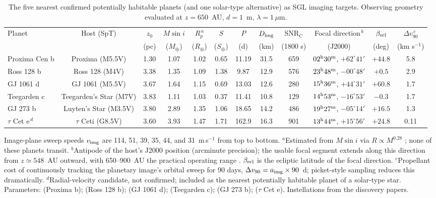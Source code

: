 ﻿\documentclass[twocolumn,10pt]{article}
\begin{document}
\begin{table}[t]
\centering
\caption{The five nearest confirmed potentially habitable planets (and
one solar-type alternative) as SGL imaging targets. Observing geometry
evaluated at $z=650$~AU, $d=1$~m, $\lambda=1\,\mu$m.}
\label{tab:targets}
\footnotesize
\setlength{\tabcolsep}{3.5pt}
\begin{tabular}{lccccccccccc}
\toprule
Planet & Host (SpT) & $z_0$ & $M\sin i$ & $R_p^{\,a}$ & $S$ & $P$ &
$D_{\rm img}$ & $\mathrm{SNR_C}$ & Focal direction$^{\,b}$ &
$\beta_{\rm ecl}$ & $\Delta v_{90}^{\,c}$ \\
 & & (pc) & ($M_\oplus$) & ($R_\oplus$) & ($S_\oplus$) & (d) & (km) &
(1800 s) & (J2000) & (deg) & (km s$^{-1}$) \\
\midrule
Proxima Cen b & Proxima (M5.5V) & 1.30 & 1.07 & 1.02 & 0.65 & 11.19 &
31.5 & 659 & $02^{\rm h}30^{\rm m}$, $+62^\circ41'$ & $+44.8$ & 5.8 \\
Ross 128 b & Ross 128 (M4V) & 3.38 & 1.35 & 1.09 & 1.38 & 9.87 &
12.9 & 576 & $23^{\rm h}48^{\rm m}$, $-00^\circ48'$ & $+0.5$ & 2.9 \\
GJ 1061 d & GJ 1061 (M5.5V) & 3.67 & 1.64 & 1.15 & 0.69 & 13.03 &
12.6 & 280 & $15^{\rm h}36^{\rm m}$, $+44^\circ31'$ & $+60.8$ & 1.7 \\
Teegarden c & Teegarden's Star (M7V) & 3.83 & 1.11 & 1.03 & 0.37 & 11.41 &
10.8 & 129 & $14^{\rm h}53^{\rm m}$, $-16^\circ53'$ & $-0.3$ & 1.7 \\
GJ 273 b & Luyten's Star (M3.5V) & 3.80 & 2.89 & 1.35 & 1.06 & 18.65 &
14.2 & 486 & $19^{\rm h}27^{\rm m}$, $-05^\circ14'$ & $+16.5$ & 1.3 \\
\midrule
$\tau$ Cet e$^{\,d}$ & $\tau$ Ceti (G8.5V) & 3.60 & 3.93 & 1.47 &
1.71 & 162.9 & 16.3 & 901 & $13^{\rm h}44^{\rm m}$, $+15^\circ56'$ &
$+24.8$ & 0.11 \\
\bottomrule
\end{tabular}

\vspace{1.5mm}
\parbox{0.94\textwidth}{\footnotesize
Image-plane sweep speeds $v_{\rm img}$ are 114, 51, 39, 35, 44, and
31~m\,s$^{-1}$ from top to bottom.
$^{a}$Estimated from $M\sin i$ via $R\propto M^{0.28}$
\citep{chenkipping17}; none of these planets transit.
$^{b}$Antipode of the host's J2000 position (arcminute precision); the
usable focal segment extends along this direction from $z\simeq548$~AU
outward, with 650--900~AU the practical operating range
\citep{tur26prop}. $\beta_{\rm ecl}$ is the ecliptic latitude of the
focal direction.
$^{c}$Propellant cost of continuously tracking the planetary image's
orbital sweep for 90 days, $\Delta v_{90}=a_{\rm img}\times90$~d;
picket-style sampling \citep{tt22dyn} reduces this dramatically.
$^{d}$Radial-velocity candidate, not confirmed; included as the nearest
potentially habitable planet of a solar-type star. Parameters:
\citet{anglada16,faria22} (Proxima b); \citet{bonfils18} (Ross 128 b);
\citet{dreizler20} (GJ 1061 d); \citet{zechmeister19,dreizler24}
(Teegarden c); \citet{astudillo17} (GJ 273 b); \citet{feng17}
($\tau$ Cet e). Instellations from the discovery papers.}
\end{table}
\end{document}
